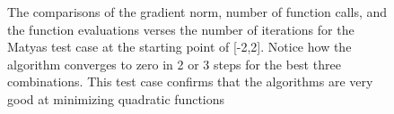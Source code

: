 \documentclass{article}
\begin{document}
\begin{figure}[htbp]
	\centering
	\qquad
	\caption{The comparisons of the gradient norm, number of function calls, and the function evaluations verses the number of iterations for the Matyas test case at the starting point of [-2,2]. Notice how the algorithm converges to zero in 2 or 3 steps for the best three combinations. This test case confirms that the algorithms are very good at minimizing quadratic functions}
	\label{fig:matyas}
\end{figure}
\end{document}
